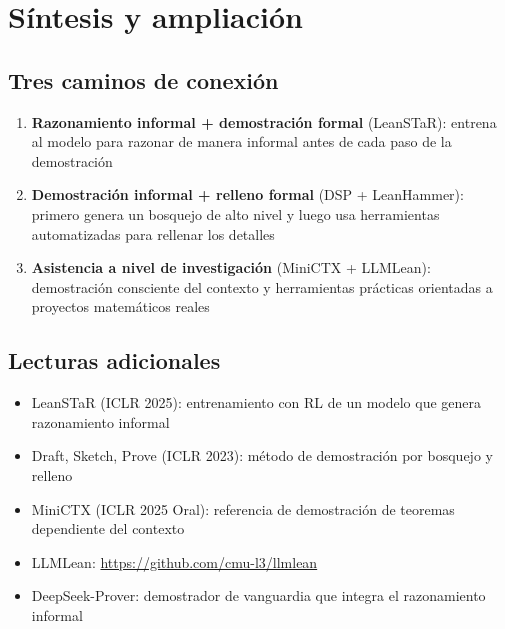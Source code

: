 \section{Síntesis y ampliación}

\subsection{Tres caminos de conexión}

\begin{enumerate}
    \item \textbf{Razonamiento informal + demostración formal} (LeanSTaR): entrena al modelo para razonar de manera informal antes de cada paso de la demostración
    \item \textbf{Demostración informal + relleno formal} (DSP + LeanHammer): primero genera un bosquejo de alto nivel y luego usa herramientas automatizadas para rellenar los detalles
    \item \textbf{Asistencia a nivel de investigación} (MiniCTX + LLMLean): demostración consciente del contexto y herramientas prácticas orientadas a proyectos matemáticos reales
\end{enumerate}

\subsection{Lecturas adicionales}
\begin{itemize}
    \item LeanSTaR (ICLR 2025): entrenamiento con RL de un modelo que genera razonamiento informal
    \item Draft, Sketch, Prove (ICLR 2023): método de demostración por bosquejo y relleno
    \item MiniCTX (ICLR 2025 Oral): referencia de demostración de teoremas dependiente del contexto
    \item LLMLean: \url{https://github.com/cmu-l3/llmlean}
    \item DeepSeek-Prover: demostrador de vanguardia que integra el razonamiento informal
\end{itemize}


